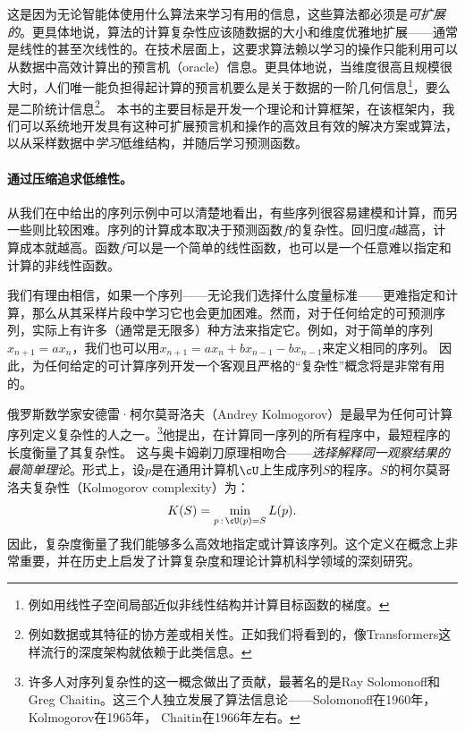 \documentclass[../../book-main_zh.tex]{subfiles}
\begin{document}
这是因为无论智能体使用什么算法来学习有用的信息，这些算法都必须是\textit{可扩展的}。更具体地说，算法的计算复杂性应该随数据的大小和维度优雅地扩展——通常是线性的甚至次线性的。在技术层面上，这要求算法赖以学习的操作只能利用可以从数据中高效计算出的预言机（oracle）信息。更具体地说，当维度很高且规模很大时，人们唯一能负担得起计算的预言机要么是关于数据的一阶几何信息\footnote{例如用线性子空间局部近似非线性结构并计算目标函数的梯度。}，要么是二阶统计信息\footnote{例如数据或其特征的协方差或相关性。正如我们将看到的，像Transformers这样流行的深度架构就依赖于此类信息。}。
本书的主要目标是开发一个理论和计算框架，在该框架内，我们可以系统地开发具有这种可扩展预言机和操作的高效且有效的解决方案或算法，以从采样数据中\textit{学习}低维结构，并随后学习预测函数。

\paragraph{通过压缩追求低维性。}
从我们在中给出的序列示例中可以清楚地看出，有些序列很容易建模和计算，而另一些则比较困难。序列的计算成本取决于预测函数\(f\)的复杂性。回归度\(d\)越高，计算成本就越高。函数\(f\)可以是一个简单的线性函数，也可以是一个任意难以指定和计算的非线性函数。

我们有理由相信，如果一个序列——无论我们选择什么度量标准——更难指定和计算，那么从其采样片段中学习它也会更加困难。然而，对于任何给定的可预测序列，实际上有许多（通常是无限多）种方法来指定它。例如，对于简单的序列\(x_{n+1}
= a x_{n}\)，我们也可以用\(x_{n+1} = a x_{n} + b x_{n-1} - b x_{n-1}\)来定义相同的序列。
因此，为任何给定的可计算序列开发一个客观且严格的“复杂性”概念将是非常有用的。

俄罗斯数学家安德雷·柯尔莫哥洛夫（Andrey
Kolmogorov）是最早为任何可计算序列定义复杂性的人之一。\footnote{许多人对序列复杂性的这一概念做出了贡献，最著名的是Ray
    Solomonoff和Greg
Chaitin。这三个人独立发展了算法信息论——Solomonoff在1960年，Kolmogorov在1965年\cite{Kolmogorov1998OnTO}，
Chaitin在1966年左右\cite{Chaitin-1966}。}他提出，在计算同一序列的所有程序中，最短程序的长度衡量了其复杂性。
这与奥卡姆剃刀原理相吻合——\textit{选择解释同一观察结果的最简单理论}。形式上，设\(p\)是在通用计算机\(\cU\)上生成序列\(S\)的程序。\(S\)的柯尔莫哥洛夫复杂性（Kolmogorov
complexity）为：
\begin{equation}
        K(S) = \min_{p\,:\, \cU(p) = S} L(p).
\end{equation}
因此，复杂度衡量了我们能够多么高效地指定或计算该序列。这个定义在概念上非常重要，并在历史上启发了计算复杂度和理论计算机科学领域的深刻研究。
\end{document}

